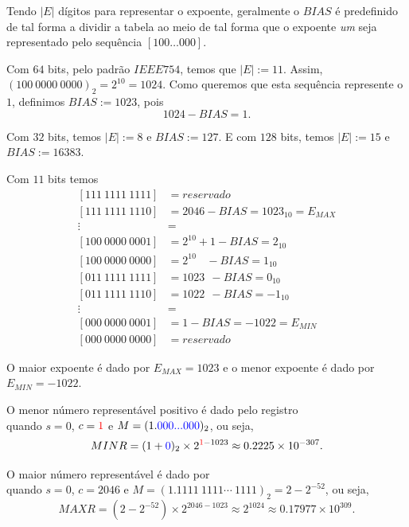 Tendo $|E|$ dígitos para representar o expoente, geralmente o $BIAS$ é predefinido de tal forma a dividir a tabela ao meio de tal forma que o expoente \textit{um} seja representado pelo sequência $[100\ldots 000]$. 

\begin{ex}
Com $64$ bits, pelo padrão $IEEE754$, temos que $|E|:=11$. Assim, $(100~0000~0000)_2=2^{10}=1024$. Como queremos que esta sequência represente o $1$, definimos $BIAS:=1023$, pois
$$ 1024-BIAS=1.$$

Com $32$ bits, temos $|E|:=8$ e $BIAS:=127$. E com $128$ bits, temos $|E|:=15$ e $BIAS:=16383$.
\end{ex}


Com $11$ bits temos 
\begin{equation*}
  \begin{split}
 [111~1111~1111] &= reservado\\
 [111~1111~1110] &= 2046-BIAS      = 1023_{10}= E_{MAX}\\
     \vdots      &=  \\
 [100~0000~0001] &= 2^{10}+1  -BIAS =  2_{10} \\
 [100~0000~0000] &= 2^{10}~~~~-BIAS =  1_{10} \\
 [011~1111~1111] &= 1023   ~~ -BIAS =  0_{10} \\
 [011~1111~1110] &= 1022   ~~ -BIAS = -1_{10} \\
     \vdots      &=  \\
 [000~0000~0001] &= 1-BIAS = -1022 = E_{MIN}\\
 [000~0000~0000] &= reservado    
  \end{split}
\end{equation*}

O maior expoente é dado por $E_{MAX}=1023$ e o menor expoente é dado por $E_{MIN}=-1022$.



O menor número representável positivo é dado pelo registro
\begin{equation*}
[0|000~0000~000\RED{1} |\BLU{0000~0000~0000\ldots 0000~0000}]  
\end{equation*}
quando $s=0$, $c={\color{red}{1}}$ e $M=(1.{\color{blue}{000...000}})_2$, ou seja,
\begin{equation*}
MINR=(1+{\color{blue}{0}})_2\times 2^{{\color{red}{1}}-1023} \approx 0.2225\times 10^{-307}.  
\end{equation*}

O maior número representável é dado por
\begin{equation*}
[0|\RED{111~1111~1110} |\BLU{1111~1111~\cdots~1111~1111}]  
\end{equation*}
quando $s=0$, $c=2046$ e $M=(1.1111~1111\cdots~1111)_2=2-2^{-52}$, ou seja,
$$
MAXR=(2-2^{-52})\times 2^{2046-1023} \approx 2^{1024}\approx0.17977\times 10^{309}.
$$


